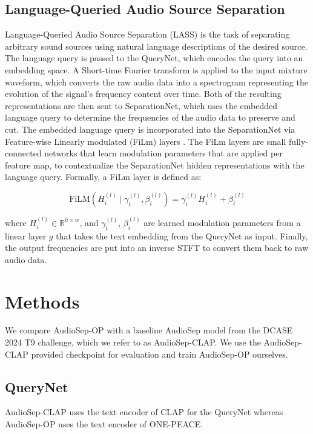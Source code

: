 \documentclass[11pt]{article}
\begin{document}
\subsection{Language-Queried Audio Source Separation}
Language-Queried Audio Source Separation (LASS) \cite{lass} is the task of separating arbitrary sound sources using natural language descriptions of the desired source. The language query is passed to the QueryNet, which encodes the query into an embedding space. A Short-time Fourier transform is applied to the input mixture waveform, which converts the raw audio data into a spectrogram representing the evolution of the signal’s frequency content over time. Both of the resulting representations are then sent to SeparationNet, which uses the embedded language query to determine the frequencies of the audio data to preserve and cut. The embedded language query is incorporated into the SeparationNet via Feature-wise Linearly modulated (FiLm) layers \cite{film}. The FiLm layers are small fully-connected networks that learn modulation parameters that are applied per feature map, to contextualize the SeparationNet hidden representations with the language query. Formally, a FiLm layer is defined as:

\begin{equation}
    \label{film_equation}
    \text{FiLM}(H_i^{(l)} \mid \gamma_i^{(l)}, \beta_i^{(l)}) = \gamma_i^{(l)} H_i^{(l)} + \beta_i^{(l)}
\end{equation}

\noindent where $H_i^{(l)} \in \mathbb{R}^{h \times w}$, and $\gamma_i^{(l)}$, $\beta_i^{(l)}$ are learned modulation parameters from a linear layer $g$ that takes the text embedding from the QueryNet as input. Finally, the output frequencies are put into an inverse STFT to convert them back to raw audio data. 


\section{Methods}
We compare AudioSep-OP with a baseline AudioSep model from the DCASE 2024 T9 challenge, which we refer to as AudioSep-CLAP. We use the AudioSep-CLAP provided checkpoint for evaluation and train AudioSep-OP ourselves.

\subsection{QueryNet}
AudioSep-CLAP uses the text encoder of CLAP for the QueryNet whereas AudioSep-OP uses the text encoder of ONE-PEACE. 
\end{document}
